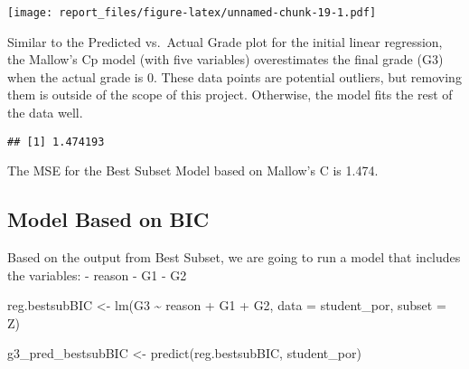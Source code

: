 \documentclass[
]{article}
\newenvironment{Shaded}{\begin{snugshade}}{\end{snugshade}}
\newcommand{\AttributeTok}[1]{\textcolor[rgb]{0.77,0.63,0.00}{#1}}
\newcommand{\DecValTok}[1]{\textcolor[rgb]{0.00,0.00,0.81}{#1}}
\newcommand{\FunctionTok}[1]{\textcolor[rgb]{0.00,0.00,0.00}{#1}}
\newcommand{\NormalTok}[1]{#1}
\newcommand{\OtherTok}[1]{\textcolor[rgb]{0.56,0.35,0.01}{#1}}
\newcommand{\SpecialCharTok}[1]{\textcolor[rgb]{0.00,0.00,0.00}{#1}}
\newcommand{\StringTok}[1]{\textcolor[rgb]{0.31,0.60,0.02}{#1}}
\begin{document}
\begin{Shaded}
\end{Shaded}

\texttt{[image: report\_files/figure-latex/unnamed-chunk-19-1.pdf]}

Similar to the Predicted vs.~Actual Grade plot for the initial linear
regression, the Mallow's Cp model (with five variables) overestimates
the final grade (G3) when the actual grade is 0. These data points are
potential outliers, but removing them is outside of the scope of this
project. Otherwise, the model fits the rest of the data well.

\begin{Shaded}
\end{Shaded}

\begin{verbatim}
## [1] 1.474193
\end{verbatim}

The MSE for the Best Subset Model based on Mallow's C is 1.474.

\hypertarget{model-based-on-bic}{%
\subsection{Model Based on BIC}\label{model-based-on-bic}}

Based on the output from Best Subset, we are going to run a model that
includes the variables: - reason - G1 - G2

\begin{Shaded}
\begin{Highlighting}[]
\NormalTok{reg.bestsubBIC }\OtherTok{\textless{}{-}} \FunctionTok{lm}\NormalTok{(G3 }\SpecialCharTok{\textasciitilde{}}\NormalTok{ reason }\SpecialCharTok{+}\NormalTok{ G1 }\SpecialCharTok{+}\NormalTok{ G2, }\AttributeTok{data =}\NormalTok{ student\_por, }\AttributeTok{subset =}\NormalTok{ Z)}

\NormalTok{g3\_pred\_bestsubBIC }\OtherTok{\textless{}{-}} \FunctionTok{predict}\NormalTok{(reg.bestsubBIC, student\_por)}
\end{Highlighting}
\end{Shaded}
\end{document}
